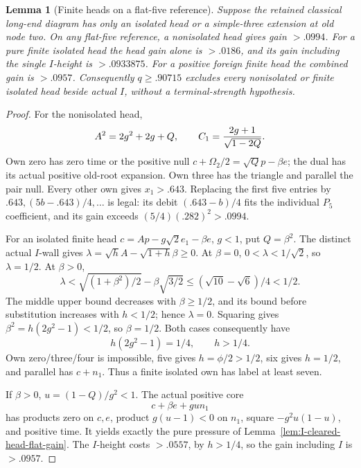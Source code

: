 \documentclass[11pt]{article}
\newtheorem{lemma}[theorem]{Lemma}
\theoremstyle{definition}
\theoremstyle{remark}
\begin{document}
\begin{lemma}[Finite heads on a flat-five reference]
\label{lem:I-finite-head-flat-reference}
Suppose the retained classical long-end diagram has only an isolated
head or a simple-three extension at old node two. On any flat-five
reference, a nonisolated head gives gain \(>.0994\).
For a pure finite isolated head the head gain alone is \(>.0186\),
and its gain including the single \(I\)-height is \(>.0933875\).
For a positive foreign finite head the combined gain is \(>.0957\).
Consequently \(q\ge.90715\) excludes every nonisolated or finite
isolated head beside actual \(I\), without a terminal-strength hypothesis.
\end{lemma}
\begin{proof}
For the nonisolated head,
\[
 A^2=2g^2+2g+Q,\qquad C_1={2g+1\over\sqrt{1-2Q}}.
\]
Own zero has zero time or the positive null
\(c+\Omega_2/2=\sqrt Qp-\beta e\);
the dual has its actual positive old-root expansion.
Own three has the triangle and parallel the pair null.
Every other own gives \(x_1>.643\). Replacing the first five entries
by \(.643,(5b-.643)/4,\ldots\) is legal: its debit
\((.643-b)/4\) fits the individual \(P_5\) coefficient, and its
gain exceeds \((5/4)(.282)^2>.0994\).

For an isolated finite head
\(c=Ap-g\sqrt2e_1-\beta e\), \(g<1\), put \(Q=\beta^2\).
The distinct actual \(I\)-wall gives
\(\lambda=\sqrt h A-\sqrt{1+h}\beta\ge0\).
At \(\beta=0\), \(0<\lambda<1/\sqrt2\), so \(\lambda=1/2\).
At \(\beta>0\),
\[
 \lambda<\sqrt{(1+\beta^2)/2}-\beta\sqrt{3/2}
 \le(\sqrt{10}-\sqrt6)/4<1/2.
\]
The middle upper bound decreases with \(\beta\ge1/2\), and its
bound before substitution increases with \(h<1/2\); hence \(\lambda=0\).
Squaring gives \(\beta^2=h(2g^2-1)<1/2\), so \(\beta=1/2\).
Both cases consequently have
\[
 h(2g^2-1)=1/4,\qquad h>1/4.
\]
Own zero/three/four is impossible, five gives \(h=\phi/2>1/2\),
six gives \(h=1/2\), and parallel has \(c+n_1\).
Thus a finite isolated own has label at least seven.

If \(\beta>0\), \(u=(1-Q)/g^2<1\). The actual positive core
\[
 c+\beta e+gu n_1
\]
has products zero on \(c,e\), product \(g(u-1)<0\) on \(n_1\),
square \(-g^2u(1-u)\), and positive time. It yields exactly the
pure pressure of Lemma~\ref{lem:I-cleared-head-flat-gain}.
The \(I\)-height costs \(>.0557\), by \(h>1/4\), so the gain
including \(I\) is \(>.0957\).


\end{proof}
\end{document}
